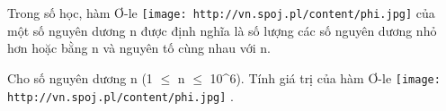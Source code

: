 Trong số học, hàm Ơ-le   
\texttt{[image: http://vn.spoj.pl/content/phi.jpg]}   của một số nguyên dương n được định nghĩa là số lượng các số nguyên dương nhỏ hơn hoặc bằng n và nguyên tố cùng nhau với n.  

   Cho số nguyên dương n (1  $\le$  n  $\le$  10^6). Tính giá trị của hàm Ơ-le   
\texttt{[image: http://vn.spoj.pl/content/phi.jpg]}   .  

\